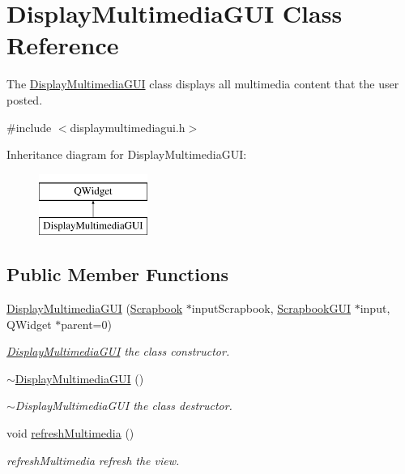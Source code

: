 \hypertarget{classDisplayMultimediaGUI}{}\section{Display\+Multimedia\+G\+UI Class Reference}
\label{classDisplayMultimediaGUI}


The \hyperlink{classDisplayMultimediaGUI}{Display\+Multimedia\+G\+UI} class displays all multimedia content that the user posted.  




{\ttfamily \#include $<$displaymultimediagui.\+h$>$}

Inheritance diagram for Display\+Multimedia\+G\+UI\+:\begin{figure}[H]
\begin{center}
\leavevmode
\includegraphics[height=2.000000cm]{classDisplayMultimediaGUI}
\end{center}
\end{figure}
\subsection*{Public Member Functions}
\begin{DoxyCompactItemize}
\item 
\hyperlink{classDisplayMultimediaGUI_ad946021cedb65c87d4fcabbda6d30467}{Display\+Multimedia\+G\+UI} (\hyperlink{classScrapbook}{Scrapbook} $\ast$input\+Scrapbook, \hyperlink{classScrapbookGUI}{Scrapbook\+G\+UI} $\ast$input, Q\+Widget $\ast$parent=0)
\begin{DoxyCompactList}\small\item\em \hyperlink{classDisplayMultimediaGUI}{Display\+Multimedia\+G\+UI} the class constructor. \end{DoxyCompactList}\item 
\hyperlink{classDisplayMultimediaGUI_a64aaa6322bb542f5c04ab9c6c188ea4c}{$\sim$\+Display\+Multimedia\+G\+UI} ()
\begin{DoxyCompactList}\small\item\em $\sim$\+Display\+Multimedia\+G\+UI the class destructor. \end{DoxyCompactList}\item 
void \hyperlink{classDisplayMultimediaGUI_a6006e182b98efbb00ec5ae66f23a6194}{refresh\+Multimedia} ()\hypertarget{classDisplayMultimediaGUI_a6006e182b98efbb00ec5ae66f23a6194}{}\label{classDisplayMultimediaGUI_a6006e182b98efbb00ec5ae66f23a6194}

\begin{DoxyCompactList}\small\item\em refresh\+Multimedia refresh the view. \end{DoxyCompactList}\end{DoxyCompactItemize}


